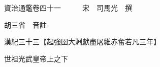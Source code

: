 










 


 
 


 

  
  
  
  
  





  
  
  
  
  
 
  

  

  
  
  



  

 
 

  
   




  

  
  


  　　資治通鑑卷四十一　　　宋　司馬光　撰

　　胡三省　音註

　　漢紀三十三【起強圉大淵獻盡屠維赤奮若凡三年】

　　世祖光武皇帝上之下

